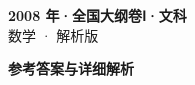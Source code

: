 \documentclass[zihao=-4, a4paper]{ctexart}
\begin{document}
\begin{center}
  {\Large\bfseries 2008 年·全国大纲卷Ⅰ·文科}\\[4pt]
  {\large 数学 · 解析版}
\end{center}
\medskip
{}

\clearpage
{}
\begin{center}{\Large\bfseries 参考答案与详细解析}\end{center}
\medskip

\end{document}
